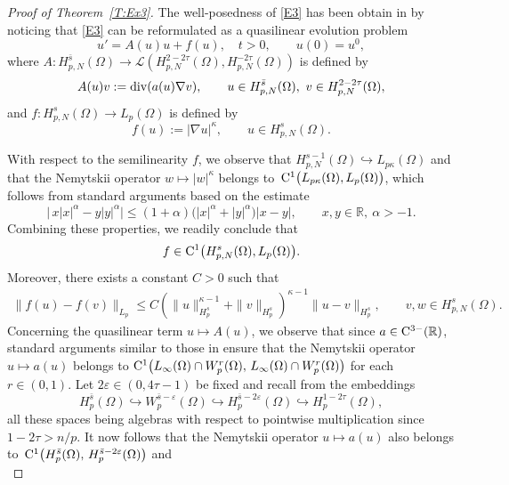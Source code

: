 \documentclass[reqno,11pt]{amsart}
\numberwithin{equation}{section}
\newcommand{\kL}{\mathcal{L}}
\theoremstyle{remark}
\begin{document}
\begin{proof}[Proof of Theorem~\ref{T:Ex3}]
The well-posedness of \eqref{E3} has been obtain in \cite[Example 3]{MRW25}  by noticing that  \eqref{E3} can be reformulated as a   quasilinear  evolution problem
\begin{equation}\label{QEE2}
u'=A(u)u+f(u),\quad t>0,\qquad u(0)=u^0,
\end{equation} 
where $A: H^{\bar s}_{p,N}(\Omega)\to\kL(H^{2-2\tau}_{p,N}(\Omega),H^{-2\tau}_{p,N}(\Omega))$ is defined by 
\[
A(u)v:={\rm div} (a(u)\nabla v),\qquad  u\in H^{\bar s}_{p,N}(\Omega),\ v\in H^{2-2\tau}_{p,N}(\Omega),
\]
and $f: H^{ s}_{p,N}(\Omega)\to L_p(\Omega)$  is defined by
\[
f(u):=|\nabla u|^{\kappa},\qquad u\in H^{ s}_{p,N}(\Omega).
\] 

With respect to the semilinearity $f$, we observe that $H^{s-1}_{p,N}(\Omega)\hookrightarrow L_{p\kappa}(\Omega)$
and that the Nemytskii operator $w \mapsto |w|^\kappa$
belongs to~${\rm C}^1\big(L_{p\kappa}(\Omega),L_{p}(\Omega)\big)$,
which follows from standard arguments based on the estimate
\[
\big|\,x|x|^\alpha - y|y|^\alpha\big|\le (1+\alpha)\big(|x|^\alpha + |y|^\alpha\big)|x-y|,\qquad x,y\in\mathbb{R},\ \alpha>-1.
\]
Combining these properties, we readily conclude that
\begin{equation*}\label{3regf}
f \in {\rm C}^1\big(H^{s}_{p,N}(\Omega),L_p(\Omega)\big).
\end{equation*}
Moreover, there exists a constant $C>0$ such that
\begin{align*}
\|f(u)-f(v)\|_{L_p}\leq C (\|u\|_{H^{s}_{p}}^{\kappa-1}+\|v\|_{H^{s}_{p}})^{\kappa-1}\|u-v\|_{H^{s}_{p}},\qquad v, w\in H^{s}_{p,N}(\Omega).
\end{align*}
Concerning the quasilinear term $u \mapsto A(u)$, we observe that since 
$a \in {\rm C}^{3-}(\mathbb{R})$, standard arguments similar to those in 
\cite[Lemma 4.1]{MW_PRSE} ensure that the Nemytskii operator 
$u \mapsto a(u)$ belongs to ${\rm C}^1\big(L_\infty(\Omega)\cap W^r_p(\Omega),\, L_\infty(\Omega)\cap W^r_p(\Omega)\big)$ for each $r\in(0,1)$.
Let $2\varepsilon \in (0,4\tau-1)$ be fixed and recall from 
\cite[Equations (5.2)–(5.6)]{Am93} the embeddings
\[
H^{\bar s}_{p}(\Omega)\hookrightarrow  W^{\bar s-\varepsilon}_{p}(\Omega)\hookrightarrow  H^{\bar s-2\varepsilon}_{p}(\Omega)\hookrightarrow  H^{1-2\tau}_{p}(\Omega),
\]
all these spaces being algebras with respect to pointwise multiplication since $1-2\tau>n/p$.
It now follows that the Nemytskii operator $u \mapsto a(u)$ also belongs to~${\rm C}^1\big(H^{\bar s}_p(\Omega),\, H^{\bar s-2\varepsilon}_p(\Omega)\big)$ and
\begin{equation*}

\end{equation*}
\end{proof}
\end{document}
